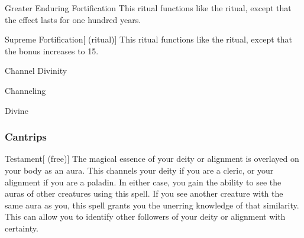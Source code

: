 \lowercase{\hypertarget{spell:Greater Enduring Fortification}{}}\label{spell:Greater Enduring Fortification}
\begin{freeability}[\nth{5}]{\hypertarget{spell:Greater Enduring Fortification}{Greater Enduring Fortification}}
This ritual functions like the  ritual, except that the effect lasts for one hundred years.
\end{freeability}
\vspace{0.25em}



\lowercase{\hypertarget{spell:Supreme Fortification}{}}\label{spell:Supreme Fortification}
\begin{attuneability}[\nth{6}]{\hypertarget{spell:Supreme Fortification}{Supreme Fortification}}[ (ritual)]
This ritual functions like the  ritual, except that the  bonus increases to 15.
\end{attuneability}
\vspace{0.25em}


\newpage
\begin{spellsection}{Channel Divinity}

\begin{spellheader}
\end{spellheader}


 Channeling

 Divine

\subsubsection{Cantrips}


\begin{apability}{Testament}[ (free)]
The magical essence of your deity or alignment is overlayed on your body as an aura.
This channels your deity if you are a cleric, or your alignment if you are a paladin.
In either case, you gain the ability to see the auras of other creatures using this spell.
If you see another creature with the same aura as you, this spell grants you the unerring knowledge of that similarity.
This can allow you to identify other followers of your deity or alignment with certainty.
\end{apability}

\end{spellsection}


